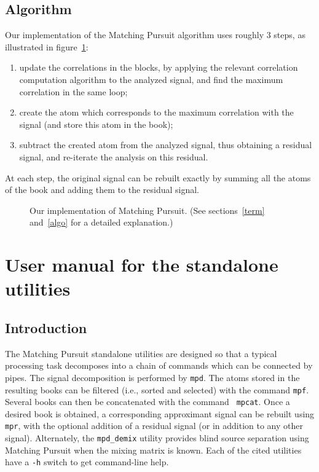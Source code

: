 \documentclass[11pt,a4paper]{article}
\begin{document}
\subsection{Algorithm \label{algo}}
Our implementation of the Matching Pursuit algorithm uses roughly 3 steps, as
illustrated in figure~\ref{mpcycle}:
\begin{enumerate}
\item update the correlations in the blocks, by applying the relevant
  correlation computation algorithm to the analyzed signal, and find the
  maximum correlation in the same loop;
\item create the atom which corresponds to the maximum correlation with the
  signal (and store this atom in the book);
\item subtract the created atom from the analyzed signal, thus obtaining a
  residual signal, and re-iterate the analysis on this residual.
\end{enumerate}
At each step, the original signal can be rebuilt exactly by summing all the
atoms of the book and adding them to the residual signal.

\begin{figure}[hbp]
\vspace{2em}
\centerline{}
\caption{\label{mpcycle}Our implementation of Matching Pursuit. (See
  sections~\ref{term} and~\ref{algo} for a detailed explanation.)}
\end{figure}


\clearpage
\section{User manual for the standalone utilities \label{man}}

\subsection{Introduction}

The Matching Pursuit standalone utilities are designed so that a typical
processing task decomposes into a chain of commands which can be connected by
pipes. The signal decomposition is performed by {\tt mpd}. The atoms stored in
the resulting books can be filtered (i.e., sorted and selected) with the
command {\tt mpf}. Several books can then be concatenated with the command {\tt
  mpcat}. Once a desired book is obtained, a corresponding approximant signal
can be rebuilt using {\tt mpr}, with the optional addition of a residual signal
(or in addition to any other signal). Alternately, the {\tt mpd\_demix} utility
provides blind source separation using Matching Pursuit when the mixing matrix
is known. Each of the cited utilities have a {\tt -h} switch to get
command-line help.
\end{document}
